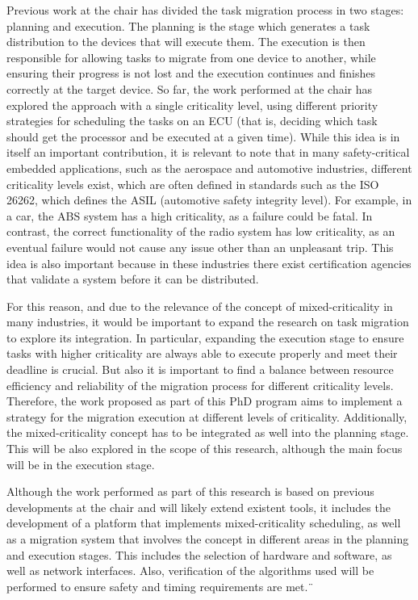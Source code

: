 Previous work at the chair has divided the task migration process in two stages: planning and execution. The planning is the stage which generates a task distribution to the devices that will execute them. The execution is then responsible for allowing tasks to migrate from one device to another, while ensuring their progress is not lost and the execution continues and finishes correctly at the target device. So far, the work performed at the chair has explored the approach with a single criticality level, using different priority strategies for scheduling the tasks on an ECU (that is, deciding which task should get the processor and be executed at a given time). While this idea is in itself an important contribution, it is relevant to note that in many safety-critical embedded applications, such as the aerospace and automotive industries, different criticality levels exist, which are often defined in standards such as the ISO 26262, which defines the ASIL (automotive safety integrity level). For example, in a car, the ABS system has a high criticality, as a failure could be fatal. In contrast, the correct functionality of the radio system has low criticality, as an eventual failure would not cause any issue other than an unpleasant trip. This idea is also important because in these industries there exist certification agencies that validate a system before it can be distributed.

For this reason, and due to the relevance of the concept of mixed-criticality in many industries, it would be important to expand the research on task migration to explore its integration. In particular, expanding the execution stage to ensure tasks with higher criticality are always able to execute properly and meet their deadline is crucial. But also it is important to find a balance between resource efficiency and reliability of the migration process for different criticality levels. Therefore, the work proposed as part of this PhD program aims to implement a strategy for the migration execution at different levels of criticality. Additionally, the mixed-criticality concept has to be integrated as well into the planning stage. This will be also explored in the scope of this research, although the main focus will be in the execution stage.

Although the work performed as part of this research is based on previous developments at the chair and will likely extend existent tools, it includes the development of a platform that implements mixed-criticality scheduling, as well as a migration system that involves the concept in different areas in the planning and execution stages. This includes the selection of hardware and software, as well as network interfaces. Also, verification of the algorithms used will be performed to ensure safety and timing requirements are met.¨

